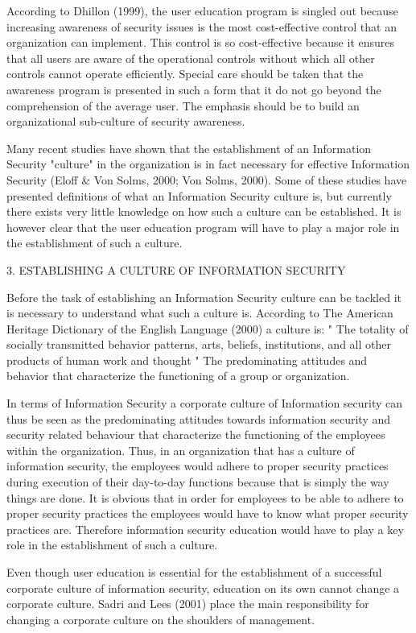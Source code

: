 According to Dhillon (1999), the user education program is singled
out because increasing awareness of security issues is the most
cost-effective control that an organization can implement. This
control is so cost-effective because it ensures that all users are
aware of the operational controls without which all other controls
cannot operate efficiently. Special care should be taken that the
awareness program is presented in such a form that it do not go
beyond the comprehension of the average user. The emphasis should
be to build an organizational sub-culture of security awareness.

Many recent studies have shown that the establishment of an
Information Security "culture" in the organization is in fact
necessary for effective Information Security (Eloff \& Von Solms,
2000; Von Solms, 2000). Some of these studies have presented
definitions of what an Information Security culture is, but
currently there exists very little knowledge on how such a culture
can be established. It is however clear that the user education
program will have to play a major role in the establishment of
such a culture.

3.  ESTABLISHING A CULTURE OF INFORMATION SECURITY

Before the task of establishing an Information Security culture
can be tackled it is necessary to understand what such a culture
is. According to The American Heritage Dictionary of the English
Language (2000) a culture is: "   The totality of socially
transmitted behavior patterns, arts, beliefs, institutions, and
all other products of human work and thought "   The predominating
attitudes and behavior that characterize the functioning of a
group or organization.

In terms of Information Security a corporate culture of
Information security can thus be seen as the predominating
attitudes towards information security and security related
behaviour that characterize the functioning of the employees
within the organization. Thus, in an organization that has a
culture of information security, the employees would adhere to
proper security practices during execution of their day-to-day
functions because that is simply the way things are done. It is
obvious that in order for employees to be able to adhere to proper
security practices the employees would have to know what proper
security practices are. Therefore information security education
would have to play a key role in the establishment of such a
culture.

Even though user education is essential for the establishment of a
successful corporate culture of information security, education on
its own cannot change a corporate culture. Sadri and Lees (2001)
place the main responsibility for changing a corporate culture on
the shoulders of management.

